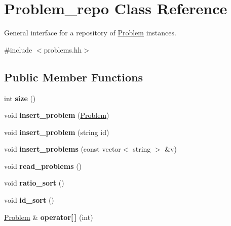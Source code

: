 \hypertarget{classProblem__repo}{}\section{Problem\+\_\+repo Class Reference}
\label{classProblem__repo}


General interface for a repository of \hyperlink{classProblem}{Problem} instances.  




{\ttfamily \#include $<$problems.\+hh$>$}

\subsection*{Public Member Functions}
\begin{DoxyCompactItemize}
\item 
\mbox{\label{classProblem__repo_a8a9a7effb0a3fbf7206c1a450263a5a6}} 
int {\bfseries size} ()
\item 
\mbox{\label{classProblem__repo_a172279d0a9f87967c514aefa11b82b28}} 
void {\bfseries insert\+\_\+problem} (\hyperlink{classProblem}{Problem})
\item 
\mbox{\label{classProblem__repo_ad860b8545f5597b167aad671310e489f}} 
void {\bfseries insert\+\_\+problem} (string id)
\item 
\mbox{\label{classProblem__repo_a40d6ea558ed2bf85496f8def862bbcac}} 
void {\bfseries insert\+\_\+problems} (const vector$<$ string $>$ \&v)
\item 
\mbox{\label{classProblem__repo_aa5be580f9a0275b273371645cab7226f}} 
void {\bfseries read\+\_\+problems} ()
\item 
\mbox{\label{classProblem__repo_a3ee73007f380fc88db4cf46a94491db0}} 
void {\bfseries ratio\+\_\+sort} ()
\item 
\mbox{\label{classProblem__repo_a131b19612b97038431144ff502cefa16}} 
void {\bfseries id\+\_\+sort} ()
\item 
\mbox{\label{classProblem__repo_a78ca286ecbdad4ed7479ba55570d4b8f}} 
\hyperlink{classProblem}{Problem} \& {\bfseries operator\mbox{[}$\,$\mbox{]}} (int)
\end{DoxyCompactItemize}


